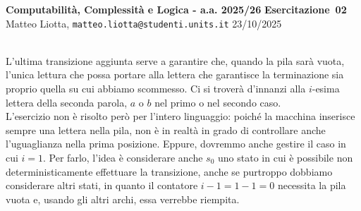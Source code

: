 \documentclass[a4paper,10pt]{article}
\makeatletter
\newcommand{\EsercitazioneNum}{02}
\newcommand{\Data}{23/10/2025}
\newcommand{\DocType}{Esercitazione} %
\newcommand{\FullTitle}{\DocType\ \EsercitazioneNum}
\newcommand{\Header}{
\noindent
  \small \textbf{Computabilità, Complessità e Logica - a.a. 2025/26} \hfill \textbf{\FullTitle} \\[0.2cm]
  \scriptsize Matteo Liotta, \texttt{matteo.liotta@studenti.units.it} \hfill \Data \\[0.2cm]
  \noindent\makebox[\linewidth]{\rule{\linewidth}{0.4pt}} \\[0.3cm]}
\newcommand{\NewPageHeader}{
  \vfill
  \noindent\makebox[\linewidth]{\rule{\linewidth}{0.4pt}}
  \newpage
  {\Header}
}
\makeatother
\begin{document}
{\begin{center}
    \end{center}
    }
\NewPageHeader
L'ultima transizione aggiunta serve a garantire che, quando la pila sarà vuota, l'unica lettura che possa portare alla lettera che garantisce la terminazione sia proprio quella su cui abbiamo scommesso. Ci si troverà d'innanzi alla $i$-esima lettera della seconda parola, $a$ o $b$ nel primo o nel secondo caso.\\

\noindent L'esercizio non è risolto però per l'intero linguaggio: poiché la macchina inserisce sempre una lettera nella pila, non è in realtà in grado di controllare anche l'uguaglianza nella prima posizione. Eppure, dovremmo anche gestire il caso in cui $i=1$.
Per farlo, l'idea è considerare anche $s_0$ uno stato in cui è possibile non deterministicamente effettuare la transizione, anche se purtroppo dobbiamo considerare altri stati, in quanto il contatore $i-1=1-1=0$ necessita la pila vuota e, usando gli altri archi, essa verrebbe riempita.
\end{document}
